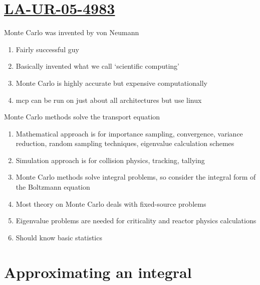 \documentclass[aspectratio=1610,pdftex,dvipsnames,compress,xcolor={dvipsnames}]{beamer}
\newcommand{\acs}{\acrshort} %
\begin{document}
\section{\href{https://mcnp.lanl.gov/pdf_files/TechReport_2005_LANL_LA-UR-05-4983_Brown.pdf}{LA-UR-05-4983}}


\addtocounter{framenumber}{-2} 
\begin{frame}{Monte Carlo was invented by von Neumann}
    \begin{enumerate}[series=outerlist,topsep=0pt,itemsep=21pt,leftmargin=*,label=(\arabic*)]
        \item[]Fairly successful guy
        \item[]Basically invented what we call `scientific computing'
        \item[]Monte Carlo is highly accurate but expensive computationally
        \item[]\acs{mcp} can be run on just about all architectures but use linux
    \end{enumerate}
\end{frame}


\begin{frame}{Monte Carlo methods solve the transport equation}
    \begin{enumerate}[series=outerlist,topsep=0pt,itemsep=21pt,leftmargin=*,label=(\arabic*)]
        \item[]Mathematical approach is for importance sampling, convergence, variance reduction, random sampling techniques, eigenvalue calculation schemes
        \item[]Simulation approach is for collision physics, tracking, tallying
        \item[]Monte Carlo methods solve integral problems, so consider the integral form of the Boltzmann equation
        \item[]Most theory on Monte Carlo deals with fixed-source problems
        \item[]Eigenvalue problems are needed for criticality and reactor physics calculations
        \item[]Should know basic statistics
    \end{enumerate}
\end{frame}


\section{Approximating an integral}
\end{document}
